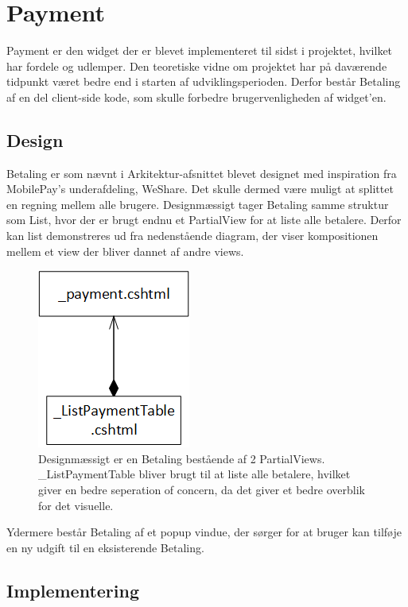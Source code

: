 \section{Payment}

Payment er den widget der er blevet implementeret til sidst i projektet, hvilket har fordele og udlemper. Den teoretiske vidne om projektet har på daværende tidpunkt været bedre end i starten af udviklingsperioden. Derfor består Betaling af en del client-side kode, som skulle forbedre brugervenligheden af widget'en. 

\subsection{Design}
Betaling er som nævnt i Arkitektur-afsnittet blevet designet med inspiration fra MobilePay's underafdeling, WeShare. Det skulle dermed være muligt at splittet en regning mellem alle brugere. Designmæssigt tager Betaling samme struktur som List, hvor der er brugt endnu et PartialView for at liste alle betalere. Derfor kan list demonstreres ud fra nedenstående diagram, der viser kompositionen mellem et view der bliver dannet af andre views.

\begin{figure}[H]
    \centering
    \includegraphics{10_Design_og_implementering/Payment/Images/Betaling_Composition.png}
    \caption{Designmæssigt er en Betaling bestående af 2 PartialViews. \_ListPaymentTable bliver brugt til at liste alle betalere, hvilket giver en bedre seperation of concern, da det giver et bedre overblik for det visuelle.}
    \label{fig:my_label}
\end{figure}

Ydermere består Betaling af et popup vindue, der sørger for at bruger kan tilføje en ny udgift til en eksisterende Betaling.

\subsection{Implementering}

